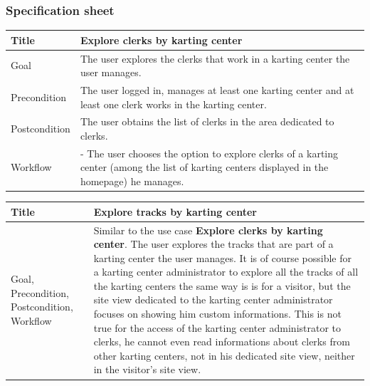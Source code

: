\documentclass{beamer}
\begin{document}
\begin{frame}
    \frametitle{Specification sheet}
    \begin{table}
        \tiny
        \begin{tabular}{|p{2cm}|p{6cm}|}
        \hline  
        Title & \textbf{Explore clerks by karting center} \\
        \hline
        Goal & The user explores the clerks that work in a karting center the user manages. \\
        \hline
        Precondition & The user logged in, manages at least one karting center and at least one clerk
        works in the karting center.\\
        \hline
        Postcondition & The user obtains the list of clerks in the area dedicated to clerks. \\
        \hline
        Workflow &
        - The user chooses the option to explore clerks of a karting center 
        (among the list of karting centers displayed in the homepage) he manages. \\
        \hline
        \end{tabular}
\end{table}

\begin{table}
    \tiny
    \begin{tabular}{|p{2cm}|p{6cm}|}
    \hline  
    Title & \textbf{Explore tracks by karting center} \\
    \hline
    Goal, Precondition, Postcondition, Workflow & Similar to the use case \textbf{Explore clerks by karting center}.
    The user explores the tracks that are part of a karting center the user manages. It is of course
    possible for a karting center administrator to explore all the tracks of all the karting centers
    the same way is is for a visitor, but the site view dedicated to the karting center administrator
    focuses on showing him custom informations. This is not true for the access of the karting center administrator 
    to clerks, he cannot even read informations about clerks from other karting centers, not in his dedicated 
    site view, neither in the visitor's site view.\\
    \hline
    \end{tabular}
\end{table}
\end{frame}
\end{document}

